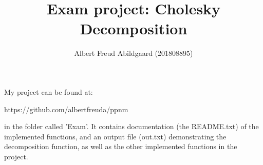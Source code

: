 \documentclass{article}
\begin{document}
\title{Exam project: Cholesky Decomposition}
\author{Albert Freud Abildgaard (201808895)}
\maketitle

My project can be found at:

\begin{center}
https://github.com/albertfreuda/ppnm
\end{center}

in the folder called 'Exam'. It contains documentation (the README.txt) of the 
implemented functions, and an output file (out.txt) demonstrating the 
decomposition function, as well as the other implemented functions in the project. 
\end{document}
